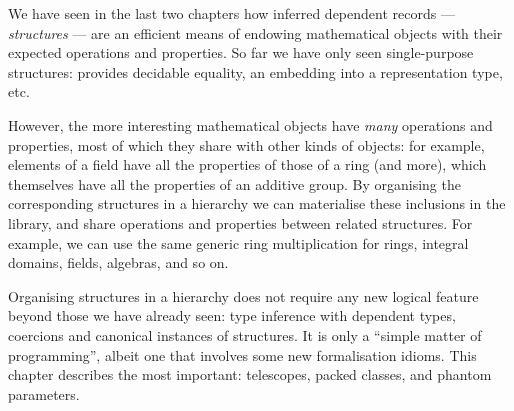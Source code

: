 \label{ch:hierarchy}






We have seen in the last two chapters how inferred dependent records
--- \emph{structures} --- are an efficient means of endowing
mathematical objects with their expected operations and properties.
So far we have only seen single-purpose structures: 
provides decidable equality,  an embedding into a
representation type, etc.

However, the more interesting mathematical objects have \emph{many}
operations and properties, most of which they share with other kinds
of objects: for example, elements of a field have all the properties
of those of a ring (and more), which themselves have all the
properties of an additive group. By organising the corresponding
\mcbCIC{} structures in a hierarchy we can materialise these
inclusions in the \mcbMC{} library, and share operations and properties
between related structures. For example, we can use the same generic
ring multiplication for rings, integral domains, fields, algebras, and
so on.

Organising structures in a hierarchy does not require any new logical
feature beyond those we have already seen: type inference with
dependent types, coercions and canonical instances of structures.  It
is only a ``simple matter of programming'', albeit one that involves
some new formalisation idioms. This chapter describes the most
important: telescopes, packed classes, and phantom parameters.


